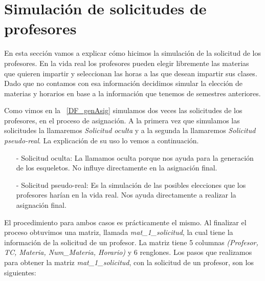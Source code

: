 \section{Simulación de solicitudes de profesores} \label{SimSolicitudesProfesores}

En esta sección vamos a explicar cómo hicimos la simulación de la solicitud de los profesores. En la vida real los profesores pueden elegir libremente las materias que quieren impartir y seleccionan las horas a las que desean impartir sus clases. Dado que no contamos con esa información decidimos simular la elección de materias y horarios en base a la información que tenemos de semestres anteriores.

Como vimos en la \figurename{~\ref{DF_genAsig}} simulamos dos veces las solicitudes de los profesores, en el proceso de asignación. A la primera vez que simulamos las solicitudes la llamaremos \textit{Solicitud oculta} y a la segunda la llamaremos \textit{Solicitud pseudo-real}. La explicación de su uso lo vemos a continuación.

\begin{itemize}
\item[-] Solicitud oculta: La llamamos oculta porque nos ayuda para la generación de los esqueletos. No influye directamente en la asignación final.

\item[-] Solicitud pseudo-real: Es la simulación de las posibles elecciones que los profesores harían en la vida real. Nos ayuda directamente a realizar la asignación final.
\end{itemize}

El procedimiento para ambos casos es prácticamente el mismo. Al finalizar el proceso obtuvimos una matriz, llamada \textit{mat\_1\_solicitud}, la cual tiene la información de la solicitud de un profesor. La matriz tiene 5 columnas \textit{(Profesor, TC, Materia, Num\_Materia, Horario)} y 6 renglones. Los pasos que realizamos para obtener la matriz \textit{mat\_1\_solicitud}, con la solicitud de un profesor, son los siguientes:

